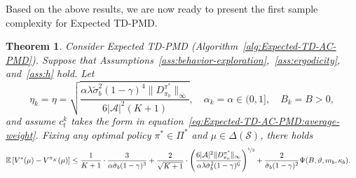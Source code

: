 \documentclass[10pt]{article}
\newcommand{\calA}{\mathcal{A}}
\newcommand{\calS}{\mathcal{S}}
\newcommand{\E}{\mathbb{E}}
\newcommand{\ls}{\left}
\newcommand{\rs}{\right}
\theoremstyle{plain}
\newtheorem{theorem}{Theorem}[section]
\theoremstyle{definition}
\begin{document}
Based on the above results, we are now ready to present the first sample complexity for Expected TD-PMD.
\begin{theorem}\label{thm:Expected-TD-AC-PMD:constant-step-size}
    Consider Expected TD-PMD \textup{(}Algorithm~\ref{alg:Expected-TD-AC-PMD}\textup{)}. Suppose that Assumptions~\ref{ass:behavior-exploration},~\ref{ass:ergodicity}, and~\ref{ass:h} hold. Let 
    \[
        \eta_k = \eta = \sqrt{\frac{\alpha\lambda\tilde\sigma_b^2 (1-\gamma)^4 \| D^{\pi^*}_{\pi_0} \|_\infty}{6|\calA|^2 (K+1)}}, \quad \alpha_k = \alpha \in (0,1], \quad B_k = B > 0,
    \]
    and assume $c_t^k$ takes the form in equation~\eqref{eq:Expected-TD-AC-PMD:average-weight}. Fixing any optimal policy $\pi^* \in \Pi^*$ and $\mu \in \Delta(\calS)$, there holds
    \begin{align*}
        \E\ls[ V^*(\mu) - V^{\pi_{\hat K}}(\mu) \rs] &\leq \frac{1}{K+1} \cdot \frac{3}{\alpha\tilde\sigma_b (1-\gamma)^3} + \frac{2}{\sqrt{K+1}} \cdot \ls( \frac{6|\calA|^2 \| D^{\pi^*}_{\pi_0} \|_\infty}{\alpha\lambda \tilde\sigma_b^2(1-\gamma)^6} \rs)^{\nicefrac{1}{2}} + \frac{2}{\tilde\sigma_b(1-\gamma)^2} \Psi(B, \vartheta, m_b, \kappa_b).
    \end{align*}
 
\end{theorem}
\end{document}

